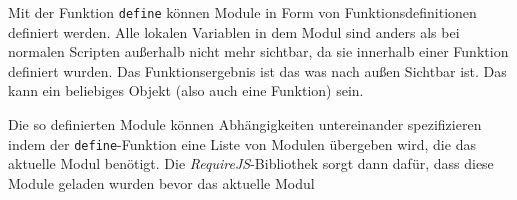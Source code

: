 Mit der Funktion \texttt{define} können Module in Form von Funktionsdefinitionen  definiert werden.
Alle lokalen Variablen in dem Modul sind anders als bei  normalen Scripten außerhalb nicht mehr
sichtbar, da sie innerhalb einer  Funktion definiert wurden. Das Funktionsergebnis ist das was nach
außen Sichtbar  ist. Das kann ein beliebiges Objekt (also auch eine Funktion) sein.

Die so definierten Module können Abhängigkeiten untereinander spezifizieren  indem der
\texttt{define}-Funktion eine Liste von Modulen übergeben wird, die  das aktuelle Modul benötigt.
Die \textit{RequireJS}-Bibliothek sorgt dann dafür,  dass diese Module geladen wurden bevor das
aktuelle Modul
